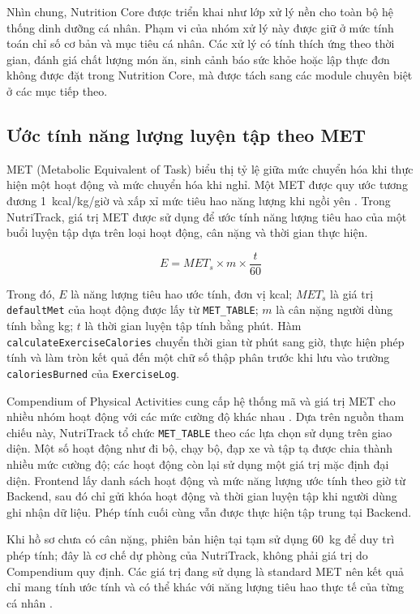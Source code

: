 \documentclass[12pt, a4paper]{report}
\begin{document}
Nhìn chung, Nutrition Core được triển khai như lớp xử lý nền cho toàn bộ hệ thống dinh dưỡng cá nhân. Phạm vi của nhóm xử lý này được giữ ở mức tính toán chỉ số cơ bản và mục tiêu cá nhân. Các xử lý có tính thích ứng theo thời gian, đánh giá chất lượng món ăn, sinh cảnh báo sức khỏe hoặc lập thực đơn không được đặt trong Nutrition Core, mà được tách sang các module chuyên biệt ở các mục tiếp theo.

\subsection{Ước tính năng lượng luyện tập theo MET}
\label{sec:met-exercise}

MET (Metabolic Equivalent of Task) biểu thị tỷ lệ giữa mức chuyển hóa khi thực hiện một hoạt động và mức chuyển hóa khi nghỉ. Một MET được quy ước tương đương 1~kcal/kg/giờ và xấp xỉ mức tiêu hao năng lượng khi ngồi yên \cite{paCompendiumWebsite}. Trong NutriTrack, giá trị MET được sử dụng để ước tính năng lượng tiêu hao của một buổi luyện tập dựa trên loại hoạt động, cân nặng và thời gian thực hiện.

\[
E = MET_s \times m \times \frac{t}{60}
\]

Trong đó, \(E\) là năng lượng tiêu hao ước tính, đơn vị kcal; \(MET_s\) là giá trị \texttt{defaultMet} của hoạt động được lấy từ \texttt{MET\_TABLE}; \(m\) là cân nặng người dùng tính bằng kg; \(t\) là thời gian luyện tập tính bằng phút. Hàm \texttt{calculateExerciseCalories} chuyển thời gian từ phút sang giờ, thực hiện phép tính và làm tròn kết quả đến một chữ số thập phân trước khi lưu vào trường \texttt{caloriesBurned} của \texttt{ExerciseLog}.

Compendium of Physical Activities cung cấp hệ thống mã và giá trị MET cho nhiều nhóm hoạt động với các mức cường độ khác nhau \cite{herrmann2024Compendium}. Dựa trên nguồn tham chiếu này, NutriTrack tổ chức \texttt{MET\_TABLE} theo các lựa chọn sử dụng trên giao diện. Một số hoạt động như đi bộ, chạy bộ, đạp xe và tập tạ được chia thành nhiều mức cường độ; các hoạt động còn lại sử dụng một giá trị mặc định đại diện. Frontend lấy danh sách hoạt động và mức năng lượng ước tính theo giờ từ Backend, sau đó chỉ gửi khóa hoạt động và thời gian luyện tập khi người dùng ghi nhận dữ liệu. Phép tính cuối cùng vẫn được thực hiện tập trung tại Backend.

Khi hồ sơ chưa có cân nặng, phiên bản hiện tại tạm sử dụng 60~kg để duy trì phép tính; đây là cơ chế dự phòng của NutriTrack, không phải giá trị do Compendium quy định. Các giá trị đang sử dụng là standard MET nên kết quả chỉ mang tính ước tính và có thể khác với năng lượng tiêu hao thực tế của từng cá nhân \cite{paCompendiumCorrectedMets}.
\end{document}

